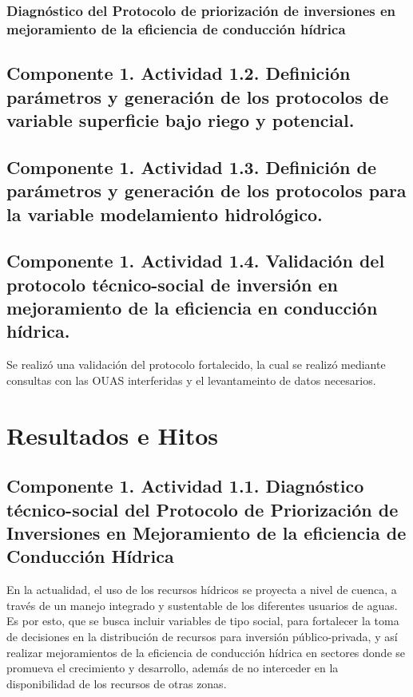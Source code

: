 \documentclass[]{article}
\begin{document}
\subsubsection{Diagnóstico del Protocolo de priorización de inversiones en mejoramiento de la eficiencia de conducción hídrica}



\subsection{Componente 1. Actividad 1.2. Definición parámetros y generación de los protocolos de variable superficie bajo riego y potencial.}

\subsection{Componente 1. Actividad 1.3. Definición de parámetros y generación de los protocolos para la variable modelamiento hidrológico.}


\subsection{Componente 1. Actividad 1.4. Validación del protocolo técnico-social de inversión en mejoramiento de la eficiencia en conducción hídrica.}

Se realizó una validación del protocolo fortalecido, la cual se realizó mediante consultas con las OUAS interferidas y el levantameinto de datos necesarios.


\clearpage
\section{Resultados e Hitos}

\subsection{Componente 1. Actividad 1.1. Diagnóstico técnico-social del Protocolo de Priorización de Inversiones en Mejoramiento de la eficiencia de Conducción Hídrica}

En la actualidad, el uso de los recursos hídricos se proyecta a nivel de cuenca, a través de un manejo integrado y sustentable de los diferentes usuarios de aguas. Es por esto, que se busca incluir variables de tipo social, para fortalecer la toma de decisiones en la distribución de recursos para inversión público-privada, y así realizar mejoramientos de la eficiencia de conducción hídrica en sectores donde se promueva el crecimiento y desarrollo, además de no interceder en la disponibilidad de los recursos de otras zonas.\\
\end{document}
